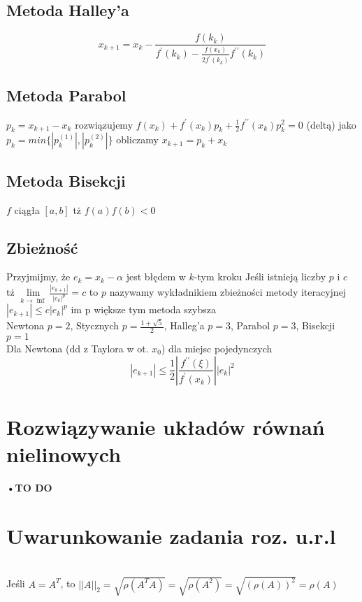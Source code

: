 \documentclass[twocolumn]{article}
\begin{document}
\begin{flushleft}
\subsection{Metoda Halley'a}
$$x_{k+1}=x_k-\frac{f(k_{k})}{f^{\prime}(k_k)-\frac{f(x_k)}{2f^\prime(k_{k})}f^{\prime \prime}(k_{k})}$$
\subsection{Metoda Parabol}
$p_k=x_{k+1}-x_k$ rozwiązujemy $f(x_k) + f^{\prime}(x_k)p_k+\frac{1}{2}f^{\prime \prime}(x_k)p_k^2=0$ (deltą) jako $p_k=min\{|p_k^{(1)}|,|p_k^{(2)}|\}$ obliczamy $x_{k+1}=p_k+x_k$
\subsection{Metoda Bisekcji}
$f$ ciągła $[a,b]$ tż $f(a)f(b) < 0$ 
\begin{algorithmic}
	\ELSE
	\ENDIF
\ENDFOR
\end{algorithmic}
\subsection{Zbieżność}
Przyjmijmy, że $e_k=x_k - \alpha$ jest błędem w $k$-tym kroku Jeśli istnieją liczby $p$ i $c$ tż $\underset{k \to \inf}{\lim}\frac{|e_{k+1}|}{|e_k|^p}=c$ to $p$ nazywamy wykładnikiem zbieżności metody iteracyjnej\\
$|e_{k+1}| \leq c|e_k|^p$ im p większe tym metoda szybsza\\
Newtona $p=2$, Stycznych $p=\frac{1+\sqrt{5}}{2}$, Halleg'a $p=3$, Parabol $p=3$, Bisekcji $p=1$\\
Dla Newtona (dd z Taylora w ot. $x_0$) dla miejsc pojedynczych
$$|e_{k+1}|\leq \frac{1}{2}\left| \frac{f^{\prime \prime}(\xi)}{f^{\prime}(x_k)}\right| |e_k|^2$$
\section{Rozwiązywanie układów równań nielinowych}
{\Large \textbf{•TO DO}}

\section{Uwarunkowanie zadania roz. u.r.l}
\\
Jeśli $A=A^T$, to $||A||_2 = \sqrt{\rho(A^TA)}=\sqrt{\rho(A^2)} =\sqrt{(\rho(A))^2}=\rho(A)$\\
\end{flushleft}
\end{document}
